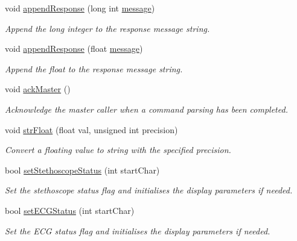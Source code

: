 void \hyperlink{_meditech___chip_kit_control_panel_8pde_a26e2576348920e813fa803510e0a6d24}{append\-Response} (long int \hyperlink{_meditech___chip_kit_control_panel_8pde_ae1956b5b6310b3339e72931911b84e3f}{message})
\begin{DoxyCompactList}\small\item\em Append the long integer to the response message string. \end{DoxyCompactList}\item 
void \hyperlink{_meditech___chip_kit_control_panel_8pde_aaf26af1780165c4f85c952760a7b5c3d}{append\-Response} (float \hyperlink{_meditech___chip_kit_control_panel_8pde_ae1956b5b6310b3339e72931911b84e3f}{message})
\begin{DoxyCompactList}\small\item\em Append the float to the response message string. \end{DoxyCompactList}\item 
void \hyperlink{_meditech___chip_kit_control_panel_8pde_a4e435af9ec30d668c4cff6a97baa8e5a}{ack\-Master} ()
\begin{DoxyCompactList}\small\item\em Acknowledge the master caller when a command parsing has been completed. \end{DoxyCompactList}\item 
void \hyperlink{_meditech___chip_kit_control_panel_8pde_a125eb587e203fa47288d5f3493506628}{str\-Float} (float val, unsigned int precision)
\begin{DoxyCompactList}\small\item\em Convert a floating value to string with the specified precision. \end{DoxyCompactList}\item 
bool \hyperlink{_meditech___chip_kit_control_panel_8pde_af1fb1c240965fd8ff8ad7ecf88651a0d}{set\-Stethoscope\-Status} (int start\-Char)
\begin{DoxyCompactList}\small\item\em Set the stethoscope status flag and initialises the display parameters if needed. \end{DoxyCompactList}\item 
bool \hyperlink{_meditech___chip_kit_control_panel_8pde_affc4e4b28b2554dffef9ef55fc1f23a4}{set\-E\-C\-G\-Status} (int start\-Char)
\begin{DoxyCompactList}\small\item\em Set the E\-C\-G status flag and initialises the display parameters if needed. \end{DoxyCompactList}\item 
